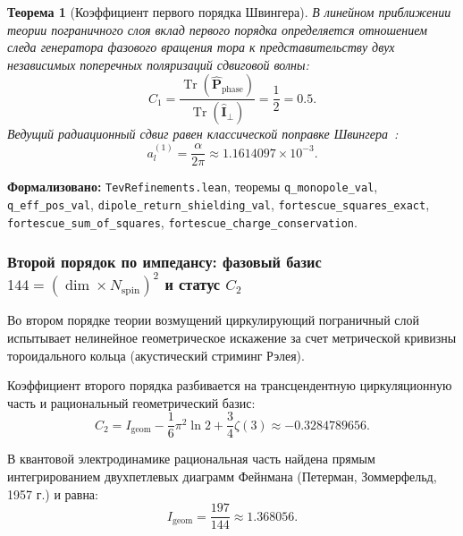 \documentclass[11pt,a4paper]{article}
\newtheorem{theorem}{Теорема}
\theoremstyle{definition}
\theoremstyle{remark}
\begin{document}
\begin{theorem}[Коэффициент первого порядка Швингера]
\label{thm:schwinger_first_order}
    В линейном приближении теории пограничного слоя вклад первого порядка определяется отношением следа генератора фазового вращения тора к представительству двух независимых поперечных поляризаций сдвиговой волны:
\begin{equation}
C_1 = \frac{\operatorname{Tr}(\hat{\mathbf{P}}_{\mathrm{phase}})}{\operatorname{Tr}(\hat{\mathbf{I}}_\perp)} = \frac{1}{2} = 0.5.
\label{eq:schwinger_c1_exact}
\end{equation}
Ведущий радиационный сдвиг равен классической поправке Швингера~\cite{Schwinger1948}:
\begin{equation}
a_l^{(1)} = \frac{\alpha}{2\pi} \approx 1.1614097 \times 10^{-3}.
\label{eq:schwinger_leading_val}
\end{equation}
\end{theorem}

\noindent\small\textbf{Формализовано:} \texttt{TevRefinements.lean}, теоремы \texttt{q_monopole_val}, \texttt{q_eff_pos_val}, \texttt{dipole_return_shielding_val}, \texttt{fortescue_squares_exact}, \texttt{fortescue_sum_of_squares}, \texttt{fortescue_charge_conservation}.

\subsubsection{Второй порядок по импедансу: фазовый базис $144 = (\dim \times N_{\mathrm{spin}})^2$ и статус $C_2$}

Во втором порядке теории возмущений циркулирующий пограничный слой испытывает нелинейное геометрическое искажение за счет метрической кривизны тороидального кольца (акустический стриминг Рэлея).

Коэффициент второго порядка разбивается на трансцендентную циркуляционную часть и рациональный геометрический базис:
\begin{equation}
C_2 = I_{\mathrm{geom}} - \frac{1}{6} \pi^2 \ln 2 + \frac{3}{4} \zeta(3) \approx -0.3284789656.
\label{eq:c2_analytical_expansion}
\end{equation}

В квантовой электродинамике рациональная часть найдена прямым интегрированием двухпетлевых диаграмм Фейнмана (Петерман, Зоммерфельд, 1957 г.) и равна:
\begin{equation}
    I_{\mathrm{geom}} = \frac{197}{144} \approx 1.368056.
    \label{eq:I_geom_fraction_exact}
\end{equation}
\end{document}
